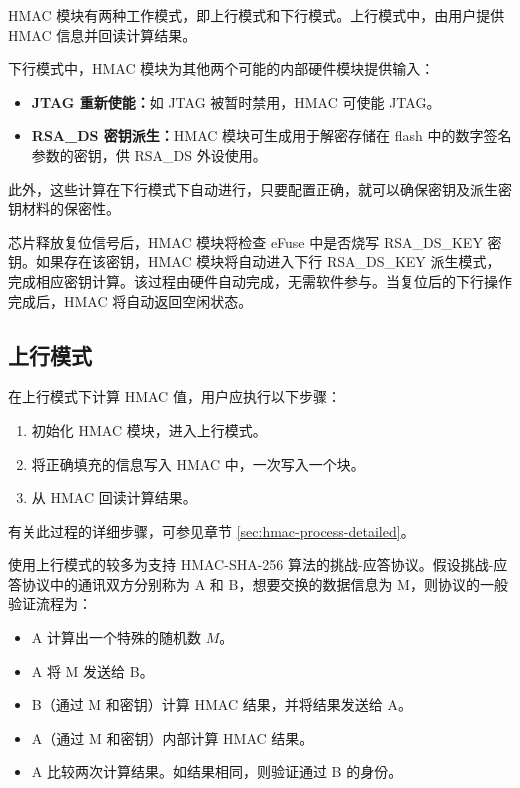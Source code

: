 \documentclass[main\_\_CN.tex]{subfiles}
\begin{document}
HMAC 模块有两种工作模式，即上行模式和下行模式。上行模式中，由用户提供 HMAC 信息并回读计算结果。

下行模式中，HMAC 模块为其他两个可能的内部硬件模块提供输入：

\begin{itemize}
    \item \textbf{JTAG 重新使能：}如 JTAG 被暂时禁用，HMAC 可使能 JTAG。
    \item \textbf{RSA\_DS 密钥派生：}HMAC 模块可生成用于解密存储在 flash 中的数字签名参数的密钥，供 RSA\_DS 外设使用。
\end{itemize}

此外，这些计算在下行模式下自动进行，只要配置正确，就可以确保密钥及派生密钥材料的保密性。

\begin{tiplisting}
芯片释放复位信号后，HMAC 模块将检查 eFuse 中是否烧写 RSA\_DS\_KEY 密钥。如果存在该密钥，HMAC 模块将自动进入下行 RSA\_DS\_KEY 派生模式，完成相应密钥计算。该过程由硬件自动完成，无需软件参与。当复位后的下行操作完成后，HMAC 将自动返回空闲状态。
\end{tiplisting}

\subsection{上行模式}

在上行模式下计算 HMAC 值，用户应执行以下步骤：

\begin{enumerate}
    \item 初始化 HMAC 模块，进入上行模式。
    \item 将正确填充的信息写入 HMAC 中，一次写入一个块。
    \item 从 HMAC 回读计算结果。
\end{enumerate}

有关此过程的详细步骤，可参见章节 \ref{sec:hmac-process-detailed}。

\begin{tiplisting}
使用上行模式的较多为支持 HMAC-SHA-256 算法的挑战-应答协议。假设挑战-应答协议中的通讯双方分别称为 A 和 B，想要交换的数据信息为 M，则协议的一般验证流程为：

\begin{itemize}
    \item A 计算出一个特殊的随机数 $M$。
    \item A 将 M 发送给 B。
    \item B（通过 M 和密钥）计算 HMAC 结果，并将结果发送给 A。
    \item A（通过 M 和密钥）内部计算 HMAC 结果。
    \item A 比较两次计算结果。如结果相同，则验证通过 B 的身份。
\end{itemize}
\end{tiplisting}
\end{document}
